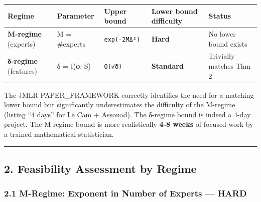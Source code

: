 \documentclass[
  12pt,
]{ctexart}
\begin{document}
\begin{longtable}[]{@{}
  >{\raggedright\arraybackslash}p{}
  >{\raggedright\arraybackslash}p{}
  >{\raggedright\arraybackslash}p{}
  >{\raggedright\arraybackslash}p{}
  >{\raggedright\arraybackslash}p{}@{}}
\toprule\noalign{}
\begin{minipage}[b]{\linewidth}\raggedright
Regime
\end{minipage} & \begin{minipage}[b]{\linewidth}\raggedright
Parameter
\end{minipage} & \begin{minipage}[b]{\linewidth}\raggedright
Upper bound
\end{minipage} & \begin{minipage}[b]{\linewidth}\raggedright
Lower bound difficulty
\end{minipage} & \begin{minipage}[b]{\linewidth}\raggedright
Status
\end{minipage} \\
\midrule\noalign{}
\endhead
\bottomrule\noalign{}
\endlastfoot
\textbf{M-regime} (experts) & M = \#experts & \texttt{exp(-2MΔ²)} &
\textbf{Hard} & No lower bound exists \\
\textbf{δ-regime} (features) & δ = I(φ; S) & \texttt{O(√δ)} &
\textbf{Standard} & Trivially matches Thm 2 \\
\end{longtable}

The JMLR PAPER\_FRAMEWORK correctly identifies the need for a matching
lower bound but significantly underestimates the difficulty of the
M-regime (listing ``4 days'' for Le Cam + Assouad). The δ-regime bound
is indeed a 4-day project. The M-regime bound is more realistically
\textbf{4-8 weeks} of focused work by a trained mathematical
statistician.

\begin{center}\rule{0.5\linewidth}{0.5pt}\end{center}

\subsection{2. Feasibility Assessment by
Regime}\label{feasibility-assessment-by-regime}

\subsubsection{2.1 M-Regime: Exponent in Number of Experts ---
HARD}\label{m-regime-exponent-in-number-of-experts-hard}
\end{document}
